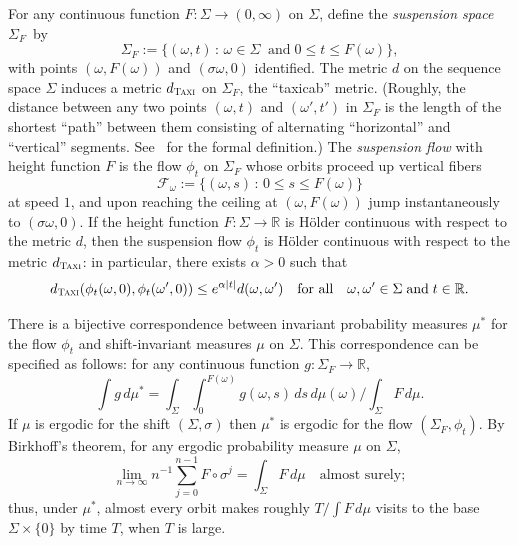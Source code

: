 \documentclass[10pt]{amsart}
\theoremstyle{definition}\newtheorem{defi}[theo]{Definition}\newtheorem{rema}[theo]{Remark}\newtheorem{exam}[theo]{Example}\newtheorem{exem}[theo]{Example}\newtheorem{nota}[theo]{Notation}
\newcommand{\zz}[1]{\mathbb #1}
\begin{document}
For any continuous function $F:\Sigma \rightarrow (0,\infty)$ on $\Sigma$, define the \emph{suspension space} $\Sigma_{F}$~by
\[
\Sigma_{F} :=\{(\omega,t)\,:\, \omega\in \Sigma \;\; \text{and} \; 0\leq t\leq F (\omega)\},
\]
with points $(\omega,F (\omega))$ and $(\sigma \omega,0)$ identified. The metric $d$ on the sequence space $\Sigma$ induces a metric $d_{\textsc{Taxi}}$ on $\Sigma_{F}$, the ``taxicab'' metric. (Roughly, the distance between any two points $(\omega, t)$ and $(\omega',t')$ in $\Sigma_{F}$ is the length of the shortest ``path'' between them consisting of alternating ``horizontal'' and ``vertical'' segments. See~\cite{bowen-walters} for the formal definition.) The \emph{suspension flow} with height function $F$ is the flow $\phi_{t}$ on $\Sigma_{F}$ whose orbits proceed up vertical fibers
\[
\mathcal{F}_{\omega}:=\{(\omega,s)\,:\,0\leq s\leq F (\omega) \}
\]
at speed $1$, and upon reaching the ceiling at $(\omega,F (\omega))$ jump instantaneously to $(\sigma \omega,0)$. If the height function $F: \Sigma \rightarrow \mathbb{R}$ is H\"older continuous with respect to the metric $d$, then the suspension flow $\phi_{t}$ is H\"older continuous with respect to the metric $d_{\textsc{Taxi}}$: in particular, there exists $\alpha>0$ such that
\begin{equation}\label{eq:suspFlowHolder}
d_{\textsc{Taxi}}(\phi_{t}(\omega,0), \phi_{t}(\omega',0))\leq e^{\alpha |t|}d(\omega,\omega') \quad \text{for all} \quad
\omega,\omega'\in\Sigma \; \text{and} \; t \in \mathbb{R}.
\end{equation}



There is a bijective correspondence between invariant probability measures $\mu^{*}$ for the flow $\phi_{t}$ and shift-invariant measures $\mu$ on $\Sigma$. This correspondence can be specified as follows: for any continuous function $g:\Sigma_{F} \rightarrow \zz{R}$,
\begin{equation}\label{eq:measure-transfer}
\int g\, d\mu^{*}=\int_{\Sigma}\int_{0}^{F (\omega)} g (\omega,s) \,ds\,d\mu (\omega) /\int_{\Sigma}F\,d\mu.
\end{equation}
If $\mu$ is ergodic for the shift $(\Sigma,\sigma)$ then $\mu^{*}$ is ergodic for the flow $(\Sigma_{F},\phi_{t})$. By Birkhoff's theorem, for any ergodic probability measure $\mu$ on $\Sigma$,
\begin{equation}\label{eq:birkhoff-F}
\lim_{n \rightarrow \infty}n^{-1}\sum_{j=0}^{n-1}F\circ\sigma^{j} =\int_{\Sigma}F\,d\mu \quad \text{almost surely};
\end{equation}
thus, under $\mu^{*}$, almost every orbit makes roughly $T/\int F\,d\mu$ visits to the base $\Sigma \times \{0 \}$ by time $T$, when $T$ is large.
\end{document}
